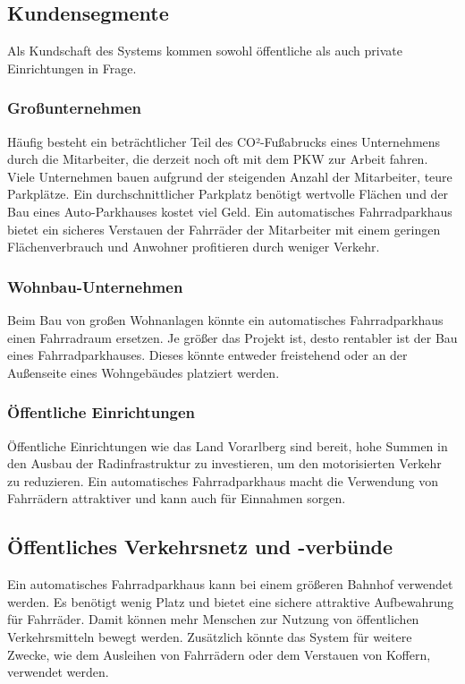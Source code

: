 \subsection{Kundensegmente}
Als Kundschaft des Systems kommen sowohl öffentliche als auch private Einrichtungen in Frage.

\subsubsection{Großunternehmen}
Häufig besteht ein beträchtlicher Teil des CO²-Fußabrucks eines Unternehmens durch die Mitarbeiter, die derzeit noch oft mit dem PKW zur Arbeit fahren. Viele Unternehmen bauen aufgrund der steigenden Anzahl der Mitarbeiter, teure Parkplätze. Ein durchschnittlicher Parkplatz benötigt wertvolle Flächen und der Bau eines Auto-Parkhauses kostet viel Geld. Ein automatisches Fahrradparkhaus bietet ein sicheres Verstauen der Fahrräder der Mitarbeiter mit einem geringen Flächenverbrauch und Anwohner profitieren durch weniger Verkehr.

\subsubsection{Wohnbau-Unternehmen}
Beim Bau von großen Wohnanlagen könnte ein automatisches Fahrradparkhaus einen Fahrradraum ersetzen. Je größer das Projekt ist, desto rentabler ist der Bau eines Fahrradparkhauses. Dieses könnte entweder freistehend oder an der Außenseite eines Wohngebäudes platziert werden.

\subsubsection{Öffentliche Einrichtungen}
Öffentliche Einrichtungen wie das Land Vorarlberg sind bereit, hohe Summen in den Ausbau der Radinfrastruktur zu investieren, um den motorisierten Verkehr zu reduzieren. Ein automatisches Fahrradparkhaus macht die Verwendung von Fahrrädern attraktiver und kann auch für Einnahmen sorgen.

\subsection{Öffentliches Verkehrsnetz und -verbünde}
Ein automatisches Fahrradparkhaus kann bei einem größeren Bahnhof verwendet werden. Es benötigt wenig Platz und bietet eine sichere attraktive Aufbewahrung für Fahrräder. Damit können mehr Menschen zur Nutzung von öffentlichen Verkehrsmitteln bewegt werden. Zusätzlich könnte das System für weitere Zwecke, wie dem Ausleihen von Fahrrädern oder dem Verstauen von Koffern, verwendet werden.


